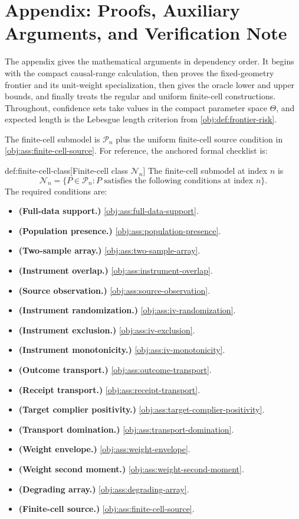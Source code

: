 \section{Appendix: Proofs, Auxiliary Arguments, and Verification Note}
\label{sec:deferred-proofs}

The appendix gives the mathematical arguments in dependency order.  It begins with the compact causal-range calculation, then proves the fixed-geometry frontier and its unit-weight specialization, then gives the oracle lower and upper bounds, and finally treats the regular and uniform finite-cell constructions.  Throughout, confidence sets take values in the compact parameter space \(\Theta\), and expected length is the Lebesgue length criterion from \cref{obj:def:frontier-risk}.

The finite-cell submodel is \(\mathcal P_n\) plus the uniform finite-cell source condition in \cref{obj:ass:finite-cell-source}.  For reference, the anchored formal checklist is:

\begin{definitionv}{def:finite-cell-class}[Finite-cell class \(\mathcal N_n\)]
The finite-cell submodel at index \(n\) is
\[
\mathcal N_n
=
\bigl\{P\in\mathcal P_n: P\text{ satisfies the following conditions at index }n\bigr\}.
\]
The required conditions are:
\begin{itemize}
\item \textbf{(Full-data support.)} \cref{obj:ass:full-data-support}.
\item \textbf{(Population presence.)} \cref{obj:ass:population-presence}.
\item \textbf{(Two-sample array.)} \cref{obj:ass:two-sample-array}.
\item \textbf{(Instrument overlap.)} \cref{obj:ass:instrument-overlap}.
\item \textbf{(Source observation.)} \cref{obj:ass:source-observation}.
\item \textbf{(Instrument randomization.)} \cref{obj:ass:iv-randomization}.
\item \textbf{(Instrument exclusion.)} \cref{obj:ass:iv-exclusion}.
\item \textbf{(Instrument monotonicity.)} \cref{obj:ass:iv-monotonicity}.
\item \textbf{(Outcome transport.)} \cref{obj:ass:outcome-transport}.
\item \textbf{(Receipt transport.)} \cref{obj:ass:receipt-transport}.
\item \textbf{(Target complier positivity.)} \cref{obj:ass:target-complier-positivity}.
\item \textbf{(Transport domination.)} \cref{obj:ass:transport-domination}.
\item \textbf{(Weight envelope.)} \cref{obj:ass:weight-envelope}.
\item \textbf{(Weight second moment.)} \cref{obj:ass:weight-second-moment}.
\item \textbf{(Degrading array.)} \cref{obj:ass:degrading-array}.
\item \textbf{(Finite-cell source.)} \cref{obj:ass:finite-cell-source}.
\end{itemize}
\end{definitionv}

